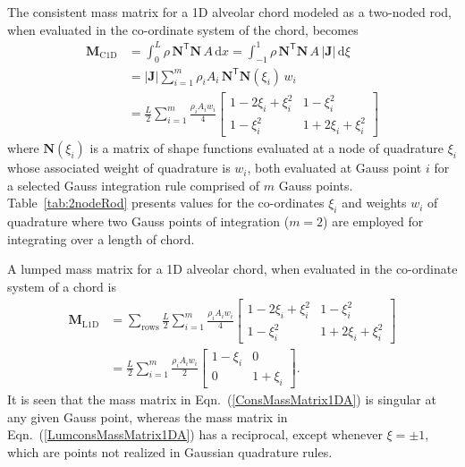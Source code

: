 The consistent mass matrix for a 1D alveolar chord modeled as a two-noded rod, when evaluated in the co-ordinate system of the chord, becomes
\begin{equation} 
\begin{aligned}
\mathbf{M}_{\mathrm{C1D}} & = \int_0^L \rho \, \mathbf{N}^{\mathsf{T}} \mathbf{N} \, A \, \mathrm{d} x  = \int_{-1}^{1} \rho \, \mathbf{N}^{\mathsf{T}} \mathbf{N}\, A \, | \mathbf{J} | \,  \mathrm{d} \xi \\ & 
= | \mathbf{J} | \sum_{i=1}^m  \rho_i A_i  \, \mathbf{N} ^{\mathsf{T}} \mathbf{N}(\xi_i) \, w_i \\ &
= \frac{L}{2} \sum_{i=1}^m \frac{\rho_i A_i w_i}{4} \begin{bmatrix}
1 - 2\xi_i + \xi_i^2 & 1 - \xi_i^2 \\
1 - \xi_i^2 & 1 + 2 \xi_i + \xi_i^2
\end{bmatrix}
\end{aligned}
\label{ConsMassMatrix1DA}
\end{equation}
where $\textbf{N} (\xi_i)$ is a matrix of shape functions evaluated at a node of quadrature $\xi_i$ whose associated weight of quadrature is $w_i$, both evaluated at Gauss point $i$ for a selected Gauss integration rule comprised of $m$ Gauss points. Table~\ref{tab:2nodeRod} presents values for the co-ordinates $\xi_i$ and weights $w_i$ of quadrature where two Gauss points of integration ($m=2$) are employed for integrating over a length of chord.  

A lumped mass matrix for a 1D alveolar chord, when evaluated in the co-ordinate system of a chord is 
\begin{equation}
    \begin{aligned}
    \mathbf{M}_{\mathrm{L1D}} & = \sum_{\text{rows}} \frac{L}{2} 
    \sum_{i=1}^m \frac{\rho_i A_i w_i}{4} \begin{bmatrix}
    1 - 2\xi_i + \xi_i^2 & 1 - \xi_i^2 \\
    1 - \xi_i^2 & 1 + 2 \xi_i + \xi_i^2
    \end{bmatrix} \\
    & = \frac{L}{2} \sum_{i=1}^m \frac{\rho_i A_i w_i}{2} \begin{bmatrix} 
    1 - \xi_i & 0 \\ 0 & 1 + \xi_i \end{bmatrix} .
    \end{aligned}
    \label{LumconsMassMatrix1DA}
\end{equation}
It is seen that the mass matrix in Eqn.~(\ref{ConsMassMatrix1DA}) is singular at any given Gauss point, whereas the mass matrix in Eqn.~(\ref{LumconsMassMatrix1DA}) has a reciprocal, except whenever $\xi = \pm 1$, which are points not realized in Gaussian quadrature rules. 


